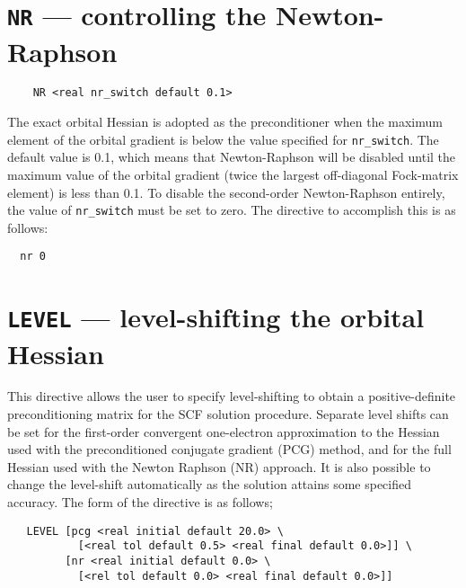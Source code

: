 \section{{\tt NR} --- controlling the Newton-Raphson}
\label{sec:nrswitch}

\begin{verbatim}
    NR <real nr_switch default 0.1>
\end{verbatim}

The exact orbital Hessian is adopted as the preconditioner when the
maximum element of the orbital gradient is below the value specified
for \verb+nr_switch+.  The default value is 0.1, which means that
Newton-Raphson will be disabled until the maximum value of the orbital
gradient (twice the largest off-diagonal Fock-matrix element) is less
than 0.1.   To disable the second-order Newton-Raphson entirely, the
value of \verb+nr_switch+ must be set to zero.  The directive to accomplish
this is as follows:
\begin{verbatim}
  nr 0
\end{verbatim}

\section{{\tt LEVEL} --- level-shifting the orbital Hessian}
\label{sec:level}

This directive allows the user to specify level-shifting to obtain a
positive-definite preconditioning matrix for the SCF solution
procedure.  Separate level shifts can be set for the first-order
convergent one-electron approximation to the Hessian used with the
preconditioned conjugate gradient (PCG) method, and for the full
Hessian used with the Newton Raphson (NR) approach.  It is also
possible to change the level-shift automatically as the solution
attains some specified accuracy.  The form of the directive is as
follows;

\begin{verbatim}
   LEVEL [pcg <real initial default 20.0> \
           [<real tol default 0.5> <real final default 0.0>]] \
         [nr <real initial default 0.0> \
           [<rel tol default 0.0> <real final default 0.0>]]
\end{verbatim}


